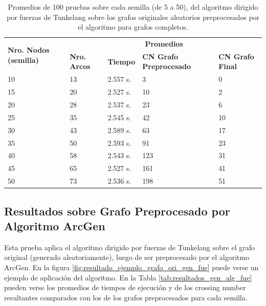 \begin{table}[H]
	\caption{Promedios de 100 pruebas sobre cada semilla (de 5 a 50), del algoritmo dirigido por fuerzas de Tunkelang sobre los grafos originales aleatorios preprocesados por el algoritmo para grafos completos.}
	\label{tab:resultados_com_alg_fue}
	\begin{tabularx}{\linewidth}{|p{1.5cm}|p{1.2cm}|p{1.5cm}|X|X|}
		\hline
		\multirow{2}{2cm}{\textbf{Nro. Nodos (semilla)}} & \multicolumn{4}{c|}{\textbf{Promedios}} \\
		\cline{2-5}
		& \textbf{Nro. Arcos} & \textbf{Tiempo} & \textbf{CN Grafo Preprocesado} & \textbf{CN Grafo Final} \\
		\hline
		10 & 13 & 2.557 s. & 3 & 0 \\
		\hline
		15 & 20 & 2.527 s. & 10 & 2 \\
		\hline
		20 & 28 & 2.537 s. & 23 & 6 \\
		\hline
		25 & 35 & 2.545 s. & 42 & 10 \\
		\hline
		30 & 43 & 2.589 s. & 63 & 17 \\
		\hline
		35 & 50 & 2.593 s. & 91 & 23 \\
		\hline
		40 & 58 & 2.543 s. & 123 & 31 \\
		\hline
		45 & 65 & 2.527 s. & 161 & 41 \\
		\hline
		50 & 73 & 2.536 s. & 198 & 51 \\
		\hline
	\end{tabularx}
\end{table}

\subsection{Resultados sobre Grafo Preprocesado por Algoritmo ArcGen}
Esta prueba aplica el algoritmo dirigido por fuerzas de Tunkelang sobre el grafo original (generado aleatoriamente), luego de ser preprocesado por el algoritmo ArcGen. En la figura \ref{fig:resultado_ejemplo_grafo_ori_gen_fue} puede verse un ejemplo de aplicación del algoritmo. En la Tabla \ref{tab:resultados_gen_alg_fue} pueden verse los promedios de tiempos de ejecución y de los crossing number resultantes comparados con los de los grafos preprocesados para cada semilla.


